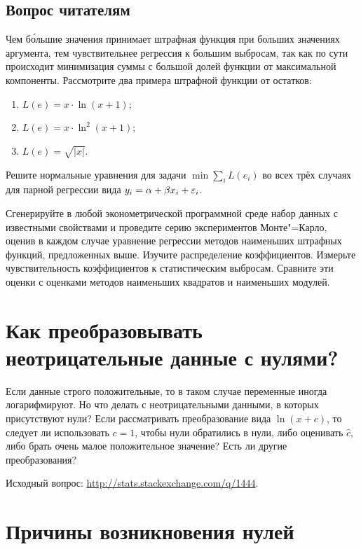 \documentclass[final,pdftex]{../../template/epsilonj}
\begin{document}
\subsection{Вопрос читателям}

Чем б\'{о}льшие значения принимает штрафная функция при больших значениях аргумента, тем чувствительнее регрессия к большим выбросам, так как по сути происходит минимизация суммы с большой долей функции от максимальной компоненты. Рассмотрите два примера штрафной функции от остатков:
\begin{enumerate}
	\item $L(e) = x\cdot \ln (x+1)$;
	\item $L(e) = x\cdot \ln^2 (x+1)$;
	\item $L(e) = \sqrt{|x|}$.
\end{enumerate}
Решите нормальные уравнения для задачи $\min \sum\limits_i L(e_i)$ во всех трёх случаях для парной регрессии вида $y_i = \alpha + \beta x_i + \varepsilon_i$. 

Сгенерируйте в любой эконометрической программной среде набор данных с известными свойствами и проведите серию экспериментов Монте"=Карло, оценив в каждом случае уравнение регрессии методов наименьших штрафных функций, предложенных выше. Изучите распределение коэффициентов. Измерьте чувствительность коэффициентов к статистическим выбросам. Сравните эти оценки с оценками методов наименьших квадратов и наименьших модулей.

\section{Как преобразовывать неотрицательные данные с нулями? }

Если данные строго положительные, то в таком случае переменные иногда логарифмируют. Но что делать с неотрицательными данными, в которых присутствуют нули? Если рассматривать преобразование вида $\ln (x+c)$, то следует ли использовать $c=1$, чтобы нули обратились в нули, либо оценивать $\hat c$, либо брать очень малое положительное значение? Есть ли другие преобразования?

Исходный вопрос: \url{http://stats.stackexchange.com/q/1444}.

\section{Причины возникновения нулей}
\end{document}
